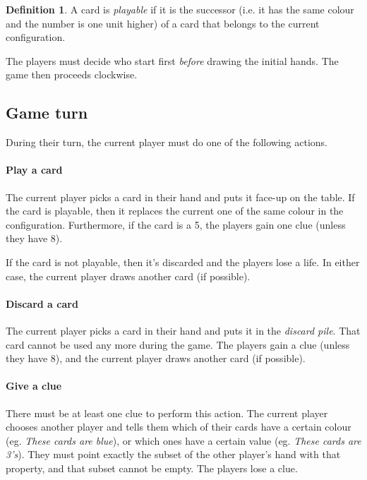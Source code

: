 \documentclass[a4paper]{article}
\theoremstyle{plain}
\theoremstyle{definition}
\newtheorem{definition}[theorem]{Definition}
\begin{document}
\begin{definition}
	A card  is \textit{playable} if it is the successor (i.e. it has the same colour and the number is one unit higher) of a card that belongs to the current configuration.
\end{definition}

The players must decide who start first \textit{before} drawing the initial hands. The game then proceeds clockwise.

\subsection{Game turn}

During their turn, the current player must do one of the following actions.

\paragraph{Play a card} The current player picks a card in their hand and puts it face-up on the table. If the card is playable, then it replaces the current one of the same colour in the configuration. Furthermore, if the card is a 5, the players gain one clue (unless they have 8).

If the card is not playable, then it's discarded and the players lose a life. In either case, the current player draws another card (if possible).

\paragraph{Discard a card} The current player picks a card in their hand and puts it in the \textit{discard pile}. That card cannot be used any more during the game. The players gain a clue (unless they have 8), and the current player draws another card (if possible).

\paragraph{Give a clue} There must be at least one clue to perform this action. The current player chooses another player and tells them which of their cards have a certain colour (eg. \textit{These cards are blue}), or which ones have a certain value (eg. \textit{These cards are 3's}). They must point exactly the subset of the other player's hand with that property, and that subset cannot be empty. The players lose a clue.
\end{document}
